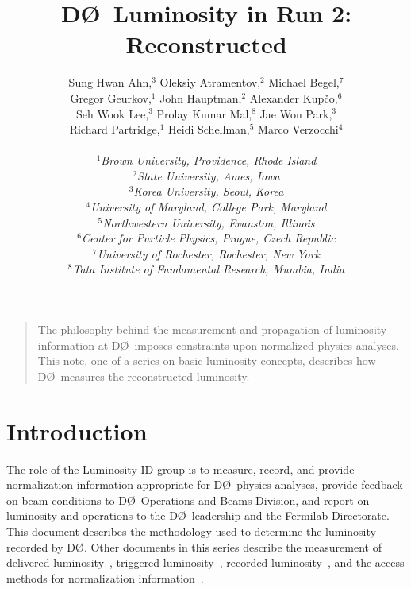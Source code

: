 \documentclass[12pt]{article}
\begin{document}
\title{D\O\ Luminosity in Run 2: Reconstructed}
\author{Sung Hwan Ahn,$^3$ 
	Oleksiy Atramentov,$^2$ 
	Michael Begel,$^7$ \\
	Gregor Geurkov,$^1$ 
	John Hauptman,$^2$ 
	Alexander Kup\v{c}o,$^6$ \\
	Seh Wook Lee,$^3$ 
	Prolay Kumar Mal,$^8$ 
	Jae Won Park,$^3$ \\
	Richard Partridge,$^1$ 
	Heidi Schellman,$^5$ 
	Marco Verzocchi$^4$
\\
\\ $^1${\it\small Brown University, Providence, Rhode Island}
\\ $^2${\it\small State University, Ames, Iowa}
\\ $^3${\it\small Korea University, Seoul, Korea}
\\ $^4${\it\small University of Maryland, College Park, Maryland}
\\ $^5${\it\small Northwestern University, Evanston, Illinois}
\\ $^6${\it\small Center for Particle Physics, Prague, Czech Republic}
\\ $^7${\it\small University of Rochester, Rochester, New York}
\\ $^8${\it\small Tata Institute of Fundamental Research, Mumbia, India}
}
\maketitle
\thispagestyle{myheadings}

\begin{quote}
The philosophy behind the measurement and propagation of luminosity
information at D\O\ imposes constraints upon normalized physics
analyses.  This note, one of a series on basic luminosity concepts,
describes how D\O\ measures the reconstructed luminosity.
\end{quote}

\section{Introduction}
The role of the Luminosity ID group is to measure, record, and provide
normalization information appropriate for D\O\ physics analyses,
provide feedback on beam conditions to D\O\ Operations and Beams
Division, and report on luminosity and operations to the D\O\
leadership and the Fermilab Directorate.  This document describes the
methodology used to determine the luminosity recorded by D\O.  Other
documents in this series describe the measurement of delivered
luminosity~\cite{3970}, triggered luminosity~\cite{3971}, recorded
luminosity~\cite{3972}, and the access methods for normalization
information~\cite{3937,3969}.
\end{document}
